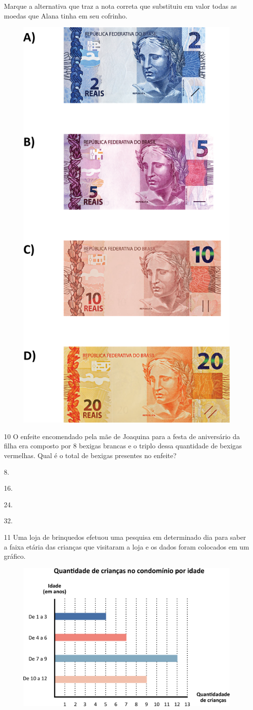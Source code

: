\pagebreak
Marque a alternativa que traz a nota correta que substituiu em valor todas as moedas que Alana tinha em seu cofrinho.

\begin{figure}[htpb!]
\includegraphics[width=.45\textwidth]{./media/image117.png}
\end{figure}

\num{10} O enfeite encomendado pela mãe de Joaquina para a festa de aniversário da filha era composto por 8 bexigas brancas e o triplo dessa quantidade de bexigas vermelhas. Qual é o total de bexigas presentes no enfeite?

\begin{escolha}
\item
  8.
\item
  16.
\item
  24.
\item
  32.
\end{escolha}

\num{11} Uma loja de brinquedos efetuou uma pesquisa em determinado dia para saber a faixa etária das crianças que visitaram a loja e os dados foram
colocados em um gráfico.

\begin{figure}[htpb!]
\centering
\includegraphics[width=\textwidth]{./media/image118.png}
\end{figure}

